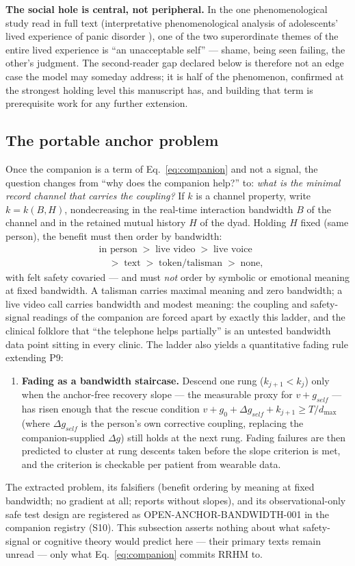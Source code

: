 \documentclass[9pt,twocolumn]{article}
\begin{document}
\textbf{The social hole is central, not peripheral.} In the one phenomenological study read in full text (interpretative phenomenological analysis of adolescents' lived experience of panic disorder \cite{baker2022}), one of the two superordinate themes of the entire lived experience is ``an unacceptable self'' --- shame, being seen failing, the other's judgment. The second-reader gap declared below is therefore not an edge case the model may someday address; it is half of the phenomenon, confirmed at the strongest holding level this manuscript has, and building that term is prerequisite work for any further extension.

\subsection{The portable anchor problem}
\label{sec:panchor}
Once the companion is a term of Eq.~\ref{eq:companion} and not a signal, the question changes from ``why does the companion help?'' to: \emph{what is the minimal record channel that carries the coupling?} If $k$ is a channel property, write $k=k(B,H)$, nondecreasing in the real-time interaction bandwidth $B$ of the channel and in the retained mutual history $H$ of the dyad. Holding $H$ fixed (same person), the benefit must then order by bandwidth:
\begin{align*}
&\text{in person} \;>\; \text{live video} \;>\; \text{live voice}\\[-0.15em]
&\quad>\; \text{text} \;>\; \text{token/talisman} \;>\; \text{none},
\end{align*}
with felt safety covaried --- and must \emph{not} order by symbolic or emotional meaning at fixed bandwidth. A talisman carries maximal meaning and zero bandwidth; a live video call carries bandwidth and modest meaning: the coupling and safety-signal readings of the companion are forced apart by exactly this ladder, and the clinical folklore that ``the telephone helps partially'' is an untested bandwidth data point sitting in every clinic. The ladder also yields a quantitative fading rule extending P9:
\begin{enumerate}[leftmargin=1.6em]
\item[P10] \textbf{Fading as a bandwidth staircase.} Descend one rung ($k_{j+1}<k_j$) only when the anchor-free recovery slope --- the measurable proxy for $v+g_{self}$ --- has risen enough that the rescue condition $v+g_0+\Delta g_{self}+k_{j+1}\ge T/d_{\max}$ (where $\Delta g_{self}$ is the person's own corrective coupling, replacing the companion-supplied $\Delta g$) still holds at the next rung. Fading failures are then predicted to cluster at rung descents taken before the slope criterion is met, and the criterion is checkable per patient from wearable data.
\end{enumerate}
The extracted problem, its falsifiers (benefit ordering by meaning at fixed bandwidth; no gradient at all; reports without slopes), and its observational-only safe test design are registered as OPEN-ANCHOR-BANDWIDTH-001 in the companion registry (S10). This subsection asserts nothing about what safety-signal or cognitive theory would predict here --- their primary texts remain unread --- only what Eq.~\ref{eq:companion} commits RRHM to.
\end{document}

